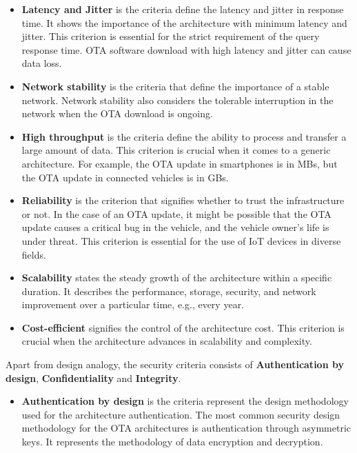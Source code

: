 \documentclass[12pt,a4paper]{article}
\begin{document}
{\begin{itemize}
\item \textbf{Latency and Jitter} is the criteria define the latency and jitter in response time. It shows the importance of the architecture with minimum latency and jitter. This criterion is essential for the strict requirement of the query response time. OTA software download with high latency and jitter can cause data loss. \cite{r2}

\item \textbf{Network stability} is the criteria that define the importance of a stable network. Network stability also considers the tolerable interruption in the network when the OTA download is ongoing. \cite{r2}

\item \textbf{High throughput} is the criteria define the ability to process and transfer a large amount of data. This criterion is crucial when it comes to a generic architecture. For example, the OTA update in smartphones is in MBs, but the OTA update in connected vehicles is in GBs. \cite{r2}

\item \textbf{Reliability} is the criterion that signifies whether to trust the infrastructure or not. In the case of an OTA update, it might be possible that the OTA update causes a critical bug in the vehicle, and the vehicle owner's life is under threat. This criterion is essential for the use of IoT devices in diverse fields. \cite{r2}

\item \textbf{Scalability} states the steady growth of the architecture within a specific duration. It describes the performance, storage, security, and network improvement over a particular time, e.g., every year. \cite{r2}

\item \textbf{Cost-efficient} signifies the control of the architecture cost. This criterion is crucial when the architecture advances in scalability and complexity. \cite{r2}

\end{itemize}

Apart from design analogy, the security criteria consists of \textbf{Authentication by design}, \textbf{Confidentiality} and \textbf{Integrity}.

\begin{itemize}

\item \textbf{Authentication by design} is the criteria represent the design methodology used for the architecture authentication. The most common security design methodology for the OTA architectures is authentication through asymmetric keys. It represents the methodology of data encryption and decryption. \cite{r22}


\end{itemize}}
\end{document}
